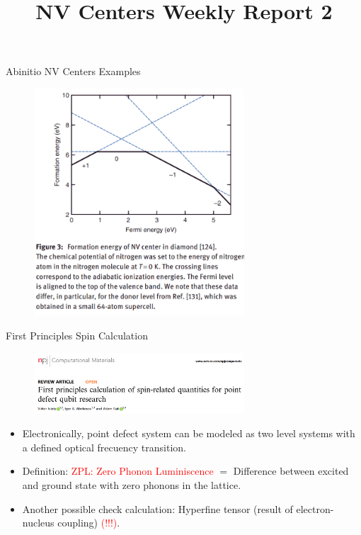 \documentclass[11pt]{beamer}
\begin{document}
\begin{frame}{Abinitio NV Centers Examples}
\begin{figure}
 \centering
    \includegraphics[width=0.7\textwidth]{Expected1.png}
 \end{figure}
\end{frame}
\title[NV-WR2]{NV Centers Weekly Report 2} 
\begin{frame}
\titlepage 
\end{frame}
\begin{frame}{First Principles Spin Calculation}
\begin{figure}
 \centering
    \includegraphics[width=0.7\textwidth]{pap2.png}
 \end{figure}
  \begin{itemize}
     \item Electronically, point defect system can be modeled as two level systems with a defined optical frecuency transition.
     \item Definition: \textcolor{red}{ZPL: Zero Phonon Luminiscence} $=$ Difference between excited and ground state with zero phonons in the lattice. 
     \item Another possible check calculation: Hyperfine tensor (result of electron-nucleus coupling) \textcolor{red}{(!!!)}.
 \end{itemize}
\end{frame}
\end{document}

